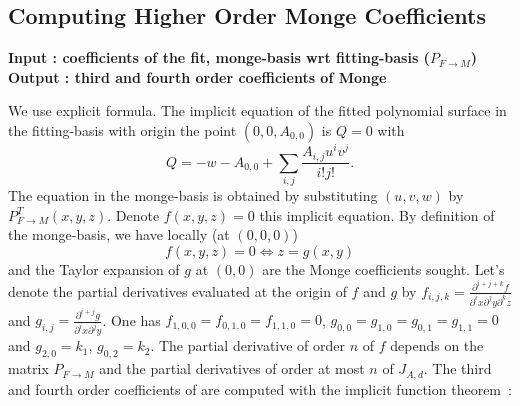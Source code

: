 \subsection{Computing  Higher Order Monge Coefficients}

{\bf Input : coefficients of the fit, monge-basis wrt fitting-basis ($P_{F
\rightarrow M}$)\\ 
Output : third and fourth order coefficients of Monge}

We use explicit formula. The implicit equation of the fitted
polynomial surface in the fitting-basis with origin the point
$(0,0,A_{0,0})$ is $Q=0$ with
\begin{equation}
Q=-w-A_{0,0}  +\sum_{i,j}\frac{A_{i,j}u^iv^j}{i!j!}.
\end{equation}
The equation in the monge-basis is obtained by substituting $(u,v,w)$
by $P^T_{F\rightarrow M}(x,y,z)$. Denote $f(x,y,z)=0$ this implicit
equation. By definition of the monge-basis, we have locally (at
$(0,0,0)$)
\begin{equation}
f(x,y,z)=0 \Leftrightarrow z=g(x,y)
\end{equation}
and the Taylor expansion of $g$ at $(0,0)$ are the Monge coefficients
sought.
%
Let's denote the partial derivatives evaluated at the origin of $f$
and $g$ by $f_{i,j,k}=\frac{\partial^{i+j+k}f}{\partial^ix
\partial^jy \partial^kz}$ and $g_{i,j}=\frac{\partial^{i+j}g}{\partial^ix
\partial^jy}$. One has $f_{1,0,0}=f_{0,1,0}=f_{1,1,0}=0$,
$g_{0,0}=g_{1,0}=g_{0,1}=g_{1,1}=0$ and $g_{2,0}=k_1$,
$g_{0,2}=k_2$. The partial derivative of order $n$ of $f$ depends on
the matrix $P_{F\rightarrow M}$ and the partial derivatives of order
at most $n$ of $J_{A,d}$. The third and fourth order coefficients of are
computed with the implicit function theorem~:
